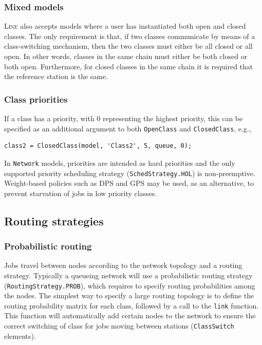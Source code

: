 \subsubsection{Mixed models}
\textsc{Line} also accepts models where a user has instantiated both open and closed classes. The only requirement is that, if two classes communicate by means of a class-switching mechanism, then the two classes must either be all closed or all open. In other words, classes in the same chain must either be both closed or both open. Furthermore, for closed classes in the same chain it is required that the reference station is the same.

\subsubsection{Class priorities}
If a class has a priority, with 0 representing the highest priority, this can be specified as an additional argument to both \texttt{OpenClass} and \texttt{ClosedClass}, e.g.,
\begin{lstlisting}
class2 = ClosedClass(model, 'Class2', 5, queue, 0);
\end{lstlisting}
In \texttt{Network} models, priorities are intended as hard priorities and the only supported priority scheduling strategy (\texttt{SchedStrategy.HOL}) is non-preemptive. Weight-based policies such as DPS and GPS may be used, as an alternative, to prevent starvation of jobs in low priority classes.

\subsection{Routing strategies}
\subsubsection{Probabilistic routing}
Jobs travel between nodes according to the network topology and a routing strategy. Typically a queueing network will use a probabilistic routing strategy (\texttt{RoutingStrategy.PROB}), which requires to specify routing probabilities among the nodes. The simplest way to specify a large routing topology is to define the routing probability matrix for each class, followed by a call to the \texttt{link} function. This function will automatically add certain nodes to the network to ensure the correct switching of class for jobs moving between stations (\texttt{ClassSwitch} elements).

